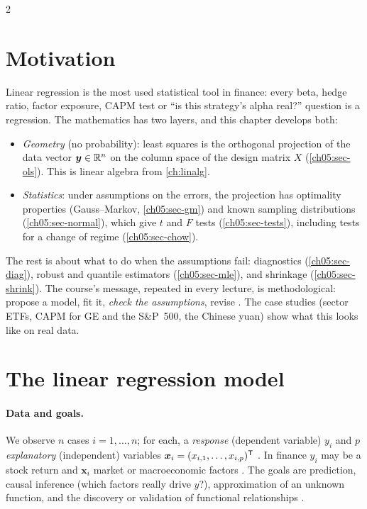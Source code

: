 \begin{paracol}{2}
\section*{Motivation}
Linear regression is the most used statistical tool in finance: every beta, hedge ratio, factor
exposure, CAPM test or ``is this strategy's alpha real?'' question is a regression. The mathematics
has two layers, and this chapter develops both:
\begin{itemize}
  \item \emph{Geometry} (no probability): least squares is the orthogonal projection of the data
        vector $\bm y\in\mathbb{R}^n$ on the column space of the design matrix $X$ (\cref{ch05:sec-ols}).
        This is linear algebra from \cref{ch:linalg}.
  \item \emph{Statistics}: under assumptions on the errors, the projection has optimality
        properties (Gauss--Markov, \cref{ch05:sec-gm}) and known sampling distributions
        (\cref{ch05:sec-normal}), which give $t$ and $F$ tests (\cref{ch05:sec-tests}), including
        tests for a change of regime (\cref{ch05:sec-chow}).
\end{itemize}
The rest is about what to do when the assumptions fail: diagnostics (\cref{ch05:sec-diag}), robust
and quantile estimators (\cref{ch05:sec-mle}), and shrinkage (\cref{ch05:sec-shrink}). The course's
message, repeated in every lecture, is methodological: propose a model, fit it, \emph{check the
assumptions}, revise . The case studies (sector ETFs, CAPM for GE and the S\&P~500,
the Chinese yuan) show what this looks like on real data.

\section{The linear regression model}\label{ch05:sec-model}

\paragraph{Data and goals.} We observe $n$ cases $i=1,\dots,n$; for each, a \emph{response}
(dependent variable) $y_i$ and $p$ \emph{explanatory} (independent) variables
$\bm x_i=(x_{i,1},\dots,x_{i,p})^{\mathsf T}$ . In finance $y_i$ may be a stock return and
$\bm x_i$ market or macroeconomic factors . The goals are prediction, causal inference
(which factors really drive $y$?), approximation of an unknown function, and the discovery or validation
of functional relationships .


\end{paracol}
